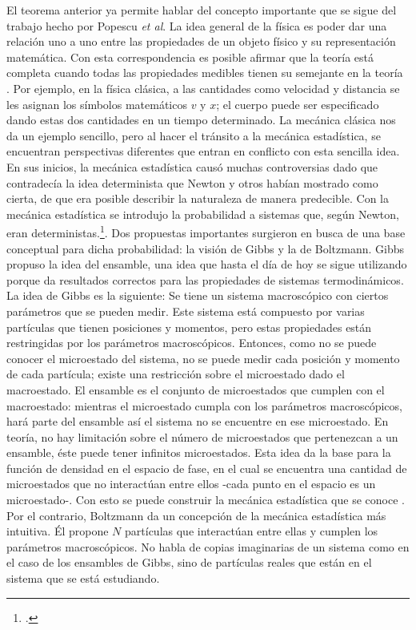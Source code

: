 El teorema anterior ya permite hablar del concepto importante que se sigue del trabajo hecho por Popescu \textit{et al}. La idea general de la física es poder dar una relación uno a uno entre las propiedades de un objeto físico y su representación matemática. Con esta correspondencia es posible afirmar que la teoría está completa cuando todas las propiedades medibles tienen su semejante en la teoría \cite{Decoherence}. Por ejemplo, en la física clásica, a las cantidades como velocidad y distancia se les asignan los símbolos matemáticos $v$ y $x$; el cuerpo puede ser especificado dando estas dos cantidades en un tiempo determinado. La mecánica clásica nos da un ejemplo sencillo, pero al hacer el tránsito a la mecánica estadística, se encuentran perspectivas diferentes que entran en conflicto con esta sencilla idea. 
\\
En sus inicios, la mecánica estadística causó muchas controversias dado que contradecía la idea determinista que Newton y otros habían mostrado como cierta, de que era posible describir la naturaleza de manera predecible. Con la mecánica estadística se introdujo la probabilidad a sistemas que, según Newton, eran deterministas.\footcite{ En este punto se debe hacer claro que la necesidad de recurrir a la probabilidad existía por falta de conocimiento, y no por un indeterminismo intrínseco como en la mecánica cuántica}. Dos propuestas importantes surgieron en busca de una base conceptual para dicha probabilidad: la visión de Gibbs y la de Boltzmann. Gibbs propuso la idea del ensamble, una idea que hasta el día de hoy se sigue utilizando porque da resultados correctos para las propiedades de sistemas termodinámicos.\\
La idea de Gibbs es la siguiente: Se tiene un sistema macroscópico con ciertos parámetros que se pueden medir. Este sistema está compuesto por varias partículas que tienen posiciones y momentos, pero estas propiedades están restringidas por los parámetros macroscópicos. Entonces, como no se puede conocer el microestado del sistema, no se puede medir cada posición y momento de cada partícula; existe una restricción sobre el microestado dado el macroestado. El ensamble es el conjunto de microestados que cumplen con el macroestado: mientras el microestado cumpla con los parámetros macroscópicos, hará parte del ensamble así el sistema no se encuentre en ese microestado. En teoría, no hay limitación sobre el número de microestados que pertenezcan a un ensamble, éste puede tener infinitos microestados. Esta idea da la base para la función de densidad en el espacio de fase, en el cual se encuentra una cantidad de microestados que no interactúan entre ellos -cada punto en el espacio es un microestado-. Con esto se puede construir la mecánica estadística que se conoce \cite{PathriaStat}. Por el contrario, Boltzmann da un concepción de la mecánica estadística más intuitiva. Él propone $N$ partículas que interactúan entre ellas y cumplen los parámetros macroscópicos. No habla de copias imaginarias de un sistema como en el caso de los ensambles de Gibbs, sino de partículas reales que están en el sistema que se está estudiando. 
